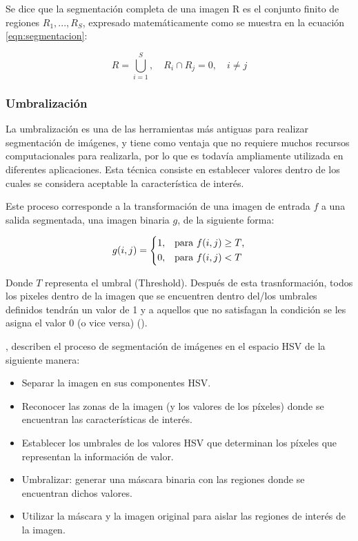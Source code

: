 Se dice que la segmentación completa de una imagen R es el conjunto finito de regiones $R_{1}, ..., R_{S}$, expresado matemáticamente como se muestra en la ecuación \ref{eqn:segmentacion}: 

\begin{equation}
R = \bigcup^{S}_{i = 1}, \quad
R_{i} \cap R_{j} = 0, \quad
i \neq j
\label{eqn:segmentacion}
\end{equation}

\subsubsection{Umbralización}
La umbralización es una de las herramientas más antiguas para realizar segmentación de imágenes, y tiene como ventaja que no requiere muchos recursos computacionales para realizarla, por lo que es todavía ampliamente utilizada en diferentes aplicaciones. Esta técnica consiste en establecer valores dentro de los cuales se considera aceptable la característica de interés.

Este proceso corresponde a la transformación de una imagen de entrada $f$ a una salida segmentada, una imagen binaria $g$, de la siguiente forma:

\begin{equation}
    g(i,j) =\begin{cases*}
        1, & para $f(i,j) \geq T$,\\
        0, & para $f(i,j) < T$ \end{cases*}    
    \label{eqn:segmented_bin}
\end{equation}

Donde $T$ representa el umbral (Threshold). Después de esta trasnformación, todos los pixeles dentro de la imagen que se encuentren dentro del/los umbrales definidos tendrán un valor de 1 y a aquellos que no satisfagan la condición se les asigna el valor 0 (o vice versa) (\cite{sonka_image_2008}). \phantom{saltodelinea}



\cite{gonzalez_digital_2002}, describen el proceso de segmentación de imágenes en el espacio HSV de la siguiente manera:
\begin{itemize}
    \item Separar la imagen en sus componentes HSV.
    \item Reconocer las zonas de la imagen (y los valores de los píxeles) donde se encuentran las características de interés.
    \item Establecer los umbrales de los valores HSV que determinan los píxeles que representan la información de valor.
    \item Umbralizar: generar una máscara binaria con las regiones donde se encuentran dichos valores.
    \item Utilizar la máscara y la imagen original para aislar las regiones de interés de la imagen.
\end{itemize}


